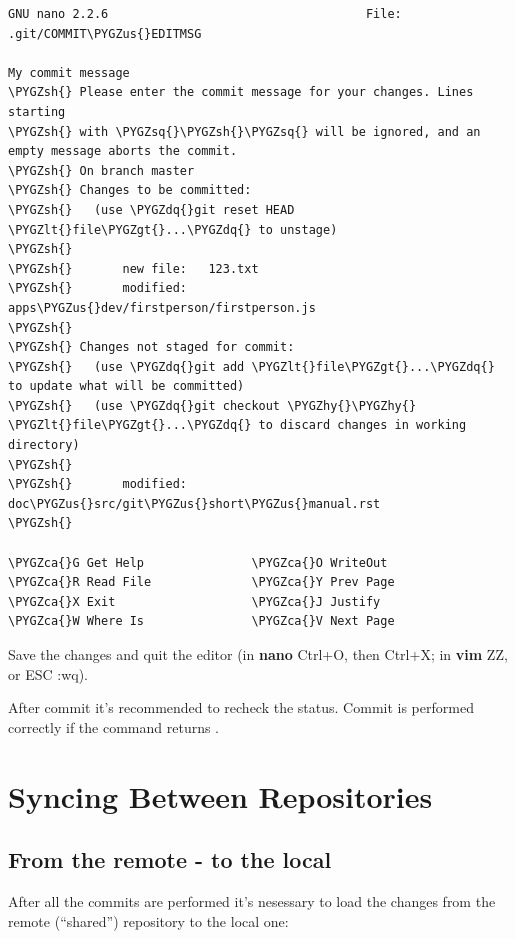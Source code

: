 \documentclass[a4paper,12pt,oneside]{sphinxmanual}
\def\PYGZus{\char`\_}
\def\PYGZca{\char`\^}
\def\PYGZlt{\char`\<}
\def\PYGZgt{\char`\>}
\def\PYGZsh{\char`\#}
\def\PYGZhy{\char`\-}
\def\PYGZsq{\char`\'}
\def\PYGZdq{\char`\"}
\begin{document}
\begin{Verbatim}[commandchars=\\\{\}]
  GNU nano 2.2.6                                    File: .git/COMMIT\PYGZus{}EDITMSG

My commit message
\PYGZsh{} Please enter the commit message for your changes. Lines starting
\PYGZsh{} with \PYGZsq{}\PYGZsh{}\PYGZsq{} will be ignored, and an empty message aborts the commit.
\PYGZsh{} On branch master
\PYGZsh{} Changes to be committed:
\PYGZsh{}   (use \PYGZdq{}git reset HEAD \PYGZlt{}file\PYGZgt{}...\PYGZdq{} to unstage)
\PYGZsh{}
\PYGZsh{}       new file:   123.txt
\PYGZsh{}       modified:   apps\PYGZus{}dev/firstperson/firstperson.js
\PYGZsh{}
\PYGZsh{} Changes not staged for commit:
\PYGZsh{}   (use \PYGZdq{}git add \PYGZlt{}file\PYGZgt{}...\PYGZdq{} to update what will be committed)
\PYGZsh{}   (use \PYGZdq{}git checkout \PYGZhy{}\PYGZhy{} \PYGZlt{}file\PYGZgt{}...\PYGZdq{} to discard changes in working directory)
\PYGZsh{}
\PYGZsh{}       modified:   doc\PYGZus{}src/git\PYGZus{}short\PYGZus{}manual.rst
\PYGZsh{}

\PYGZca{}G Get Help               \PYGZca{}O WriteOut               \PYGZca{}R Read File              \PYGZca{}Y Prev Page
\PYGZca{}X Exit                   \PYGZca{}J Justify                \PYGZca{}W Where Is               \PYGZca{}V Next Page
\end{Verbatim}

Save the changes and quit the editor (in \textbf{nano} Ctrl+O, then Ctrl+X; in \textbf{vim} ZZ, or ESC :wq).

After commit it's recommended to recheck the status. Commit is performed correctly if the  command returns .


\section{Syncing Between Repositories}
\label{git_short_manual:id13}\label{git_short_manual:index-6}\label{git_short_manual:git-example-repo-sync}

\subsection{From the remote - to the local}
\label{git_short_manual:id14}
After all the commits are performed it's nesessary to load the changes from the remote (``shared'') repository to the local one:
\end{document}
